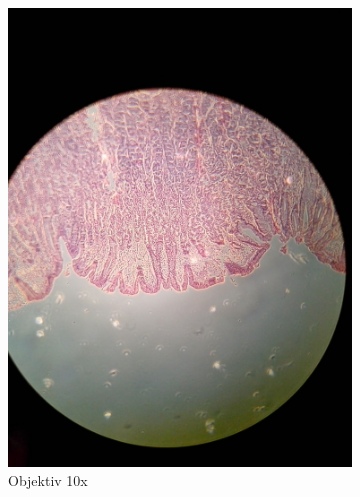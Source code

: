 \begin{figure}[h!]
\begin{subfigure}[b]{0.3\textwidth}
		\includegraphics[width=1\textwidth]{../images/02_stomach.jpg}
		\caption{Objektiv 10x}
	\end{subfigure}
	\begin{subfigure}[b]{0.3\textwidth}

\end{subfigure}
\end{figure}
